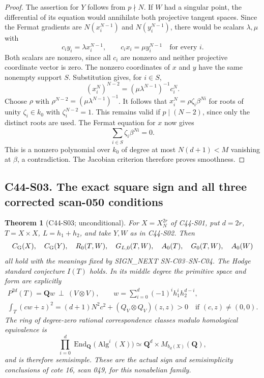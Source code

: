 \documentclass[11pt]{article}
\newtheorem{theorem}{Theorem}[section]
\theoremstyle{remark}\newtheorem{remark}[theorem]{Remark}
\begin{document}
\begin{proof}
The assertion for $Y$ follows from $p\nmid N$.  If $W$ had
a singular point, the differential of its equation would
annihilate both projective tangent spaces.  Since the
Fermat gradients are $N(x_i^{N-1})$ and $N(y_i^{N-1})$,
there would be scalars $\lambda,\mu$ with
\[
 c_iy_i=\lambda x_i^{N-1},\qquad
 c_ix_i=\mu y_i^{N-1}\quad\text{for every }i.
\]
Both scalars are nonzero, since all $c_i$ are nonzero and
neither projective coordinate vector is zero.  The nonzero
coordinates of $x$ and $y$ have the same nonempty support
$S$.  Substitution gives, for $i\in S$,
\[
 (x_i^N)^{N-2}=(\mu\lambda^{N-1})^{-1}c_i^N.
\]
Choose $\rho$ with $\rho^{N-2}=(\mu\lambda^{N-1})^{-1}$.
It follows that
$x_i^N=\rho\zeta_i\beta^{Ni}$ for roots of unity
$\zeta_i\in k_0$ with $\zeta_i^{N-2}=1$.
This remains valid if $p\mid(N-2)$, since only the distinct
roots are used.  The Fermat equation for $x$ now gives
\[
 \sum_{i\in S}\zeta_i\beta^{Ni}=0.
\]
This is a nonzero polynomial over $k_0$ of degree at most
$N(d+1)<M$ vanishing at $\beta$, a contradiction.  The
Jacobian criterion therefore proves smoothness.
\end{proof}

\subsection*{C44-S03. The exact square sign and all three corrected scan-050 conditions}

\begin{theorem}[C44-S03; unconditional]
For $X=X_N^{2r}$ of C44-S01, put $d=2r$, $T=X\times X$,
$L=h_1+h_2$, and take $Y,W$ as in C44-S02.  Then
\[
 C_{\rm G}(X),\quad C_{\rm G}(Y),\quad R_0(T,W),\quad
 G_{L,0}(T,W),\quad A_0(T),\quad G_0(T,W),\quad A_0(W)
\]
all hold with the meanings fixed by SIGN\_NEXT SN-C03--SN-C04.
The Hodge standard conjecture $I(T)$ holds.  In its middle
degree the primitive space and form are explicitly
\begin{gather}
 P^{2d}(T)=\mathbf Qw\ \perp\ (V\otimes V),\qquad
 w=\sum_{i=0}^{d}(-1)^ih_1^ih_2^{d-i},\label{c44:fermat-square-primitive}\\
 \int_T(cw+z)^2=(d+1)N^2c^2+(Q_V\otimes Q_V)(z,z)>0
 \quad\text{if }(c,z)\ne(0,0).\label{c44:fermat-square-sign}
\end{gather}
The ring of degree-zero rational correspondence classes
modulo homological equivalence is
\[
 \prod_{i=0}^{d}\operatorname{End}_{\mathbf Q}
       \bigl(\operatorname{Alg}^i(X)\bigr)
 \simeq \mathbf Q^d\times M_{b_d(X)}(\mathbf Q),
\]
and is therefore semisimple.  These are the actual sign and
semisimplicity conclusions of cote 16, scan 049, for this
nonabelian family.
\end{theorem}
\end{document}
